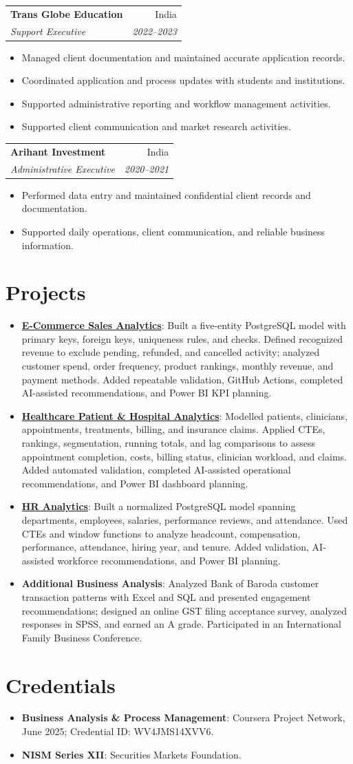 \documentclass[letterpaper,11pt]{article}
\makeatletter
\newcommand{\resumeProject}[2]{
  \item\small{\textbf{#1}: #2\vspace{-2pt}}
}
\newcommand{\experienceHeading}[4]{
  \vspace{1pt}\noindent
  \begin{tabular*}{\textwidth}{l@{\extracolsep{\fill}}r}
    \textbf{#1} & #2 \\
    \textit{#3} & \textit{\small #4} \\
  \end{tabular*}\vspace{-4pt}
}
\newcommand{\experienceBullet}[1]{
  \item\small{#1\vspace{-2pt}}
}
\newcommand{\resumeSubHeadingListStart}{\begin{itemize}[leftmargin=*,topsep=1pt,itemsep=2pt,parsep=0pt,partopsep=0pt]}
\newcommand{\resumeSubHeadingListEnd}{\end{itemize}\vspace{-2pt}}
\newcommand{\experienceItemListStart}{\begin{itemize}[leftmargin=1.15em,topsep=1pt,itemsep=0pt,parsep=0pt,partopsep=0pt]}
\newcommand{\experienceItemListEnd}{\end{itemize}\vspace{2pt}}
\makeatother
\begin{document}
\experienceHeading{Trans Globe Education}{India}{Support Executive}{2022--2023}
\experienceItemListStart
  \experienceBullet{Managed client documentation and maintained accurate application records.}
  \experienceBullet{Coordinated application and process updates with students and institutions.}
  \experienceBullet{Supported administrative reporting and workflow management activities.}
  \experienceBullet{Supported client communication and market research activities.}
\experienceItemListEnd

\experienceHeading{Arihant Investment}{India}{Administrative Executive}{2020--2021}
\experienceItemListStart
  \experienceBullet{Performed data entry and maintained confidential client records and documentation.}
  \experienceBullet{Supported daily operations, client communication, and reliable business information.}
\experienceItemListEnd

\section{Projects}
\resumeSubHeadingListStart
  \resumeProject{\href{https://github.com/jainalimehta/Ecommerce-Sales-Analytics}{E-Commerce Sales Analytics}}{Built a five-entity PostgreSQL model with primary keys, foreign keys, uniqueness rules, and checks. Defined recognized revenue to exclude pending, refunded, and cancelled activity; analyzed customer spend, order frequency, product rankings, monthly revenue, and payment methods. Added repeatable validation, GitHub Actions, completed AI-assisted recommendations, and Power BI KPI planning.}
  \resumeProject{\href{https://github.com/jainalimehta/Healthcare-Analytics}{Healthcare Patient \& Hospital Analytics}}{Modelled patients, clinicians, appointments, treatments, billing, and insurance claims. Applied CTEs, rankings, segmentation, running totals, and lag comparisons to assess appointment completion, costs, billing status, clinician workload, and claims. Added automated validation, completed AI-assisted operational recommendations, and Power BI dashboard planning.}
  \resumeProject{\href{https://github.com/jainalimehta/HR-Analytics}{HR Analytics}}{Built a normalized PostgreSQL model spanning departments, employees, salaries, performance reviews, and attendance. Used CTEs and window functions to analyze headcount, compensation, performance, attendance, hiring year, and tenure. Added validation, AI-assisted workforce recommendations, and Power BI planning.}
  \resumeProject{Additional Business Analysis}{Analyzed Bank of Baroda customer transaction patterns with Excel and SQL and presented engagement recommendations; designed an online GST filing acceptance survey, analyzed responses in SPSS, and earned an A grade. Participated in an International Family Business Conference.}
\resumeSubHeadingListEnd

\section{Credentials}
\resumeSubHeadingListStart
  \resumeProject{Business Analysis \& Process Management}{Coursera Project Network, June 2025; Credential ID: WV4JMS14XVV6.}
  \resumeProject{NISM Series XII}{Securities Markets Foundation.}
\resumeSubHeadingListEnd
\end{document}
